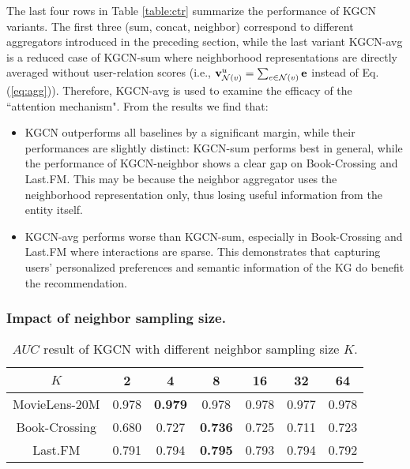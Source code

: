 \documentclass[sigconf]{acmart}
\begin{document}
        The last four rows in Table \ref{table:ctr} summarize the performance of KGCN variants.
        The first three (sum, concat, neighbor) correspond to different aggregators introduced in the preceding section, while the last variant KGCN-avg is a reduced case of KGCN-sum where neighborhood representations are directly averaged without user-relation scores (i.e., ${\bf v}_{\mathcal N(v)}^u = \sum_{e \in \mathcal N(v)} {\bf e}$ instead of Eq. (\ref{eq:agg})).
        Therefore, KGCN-avg is used to examine the efficacy of the ``attention mechanism".
        From the results we find that:
        \begin{itemize}
        	\item
        		KGCN outperforms all baselines by a significant margin, while their performances are slightly distinct:
        		KGCN-sum performs best in general, while the performance of KGCN-neighbor shows a clear gap on Book-Crossing and Last.FM.
        		This may be because the neighbor aggregator uses the neighborhood representation only, thus losing useful information from the entity itself.
        	\item
        		KGCN-avg performs worse than KGCN-sum, especially in Book-Crossing and Last.FM where interactions are sparse.
        		This demonstrates that capturing users' personalized preferences and semantic information of the KG do benefit the recommendation.
        \end{itemize}
        
		
		\subsubsection{Impact of neighbor sampling size.}
			\begin{table}[t]
				\centering
				\setlength{\tabcolsep}{4pt}
				\caption{$AUC$ result of KGCN with different neighbor sampling size $K$.}
				\begin{tabular}{c|cccccc}
					\hline
					$K$ & 2 & 4 & 8 & 16 & 32 & 64\\
					\hline
					MovieLens-20M & 0.978 & \textbf{0.979} & 0.978 & 0.978 & 0.977 & 0.978\\
					Book-Crossing & 0.680 & 0.727 & \textbf{0.736} & 0.725 & 0.711 & 0.723\\
					Last.FM & 0.791 & 0.794 & \textbf{0.795} & 0.793 & 0.794 & 0.792\\
					\hline
				\end{tabular}
				\label{table:K}
			\end{table}	
			
\end{document}
